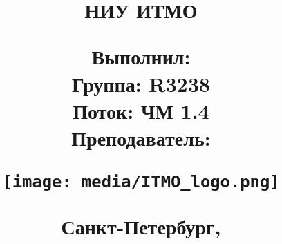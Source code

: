 \begin{titlepage}

\thispagestyle{empty}

\title{

НИУ ИТМО 
\vspace{2em}

\begin{center}
\LARGE{\textbf{\name}}

\subname

\end{center}

\vspace{2em}

\begin{flushright}
\large{ 
Выполнил: \textbf{\madeby} \\
Группа: \textbf{R3238} \\
Поток:  \textbf{ЧМ 1.4} \\
Преподаватель: \textbf{\teacher} 
}
\end{flushright}	

\texttt{[image: media/ITMO\_logo.png]} 



\begin{center}
\normalsize{Санкт-Петербург, \the\year}
\end{center}
}

\date{}
\maketitle
\thispagestyle{empty}
\end{titlepage}